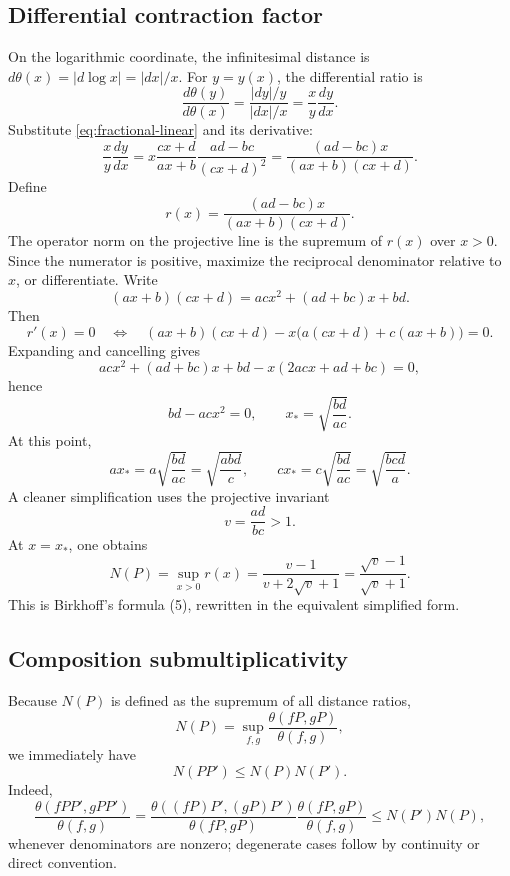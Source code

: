 \documentclass[11pt]{article}
\begin{document}
\subsection{Differential contraction factor}
On the logarithmic coordinate, the infinitesimal distance is \(d\theta(x)=|d\log x|=|dx|/x\).  For \(y=y(x)\), the differential ratio is
\begin{equation}
  \frac{d\theta(y)}{d\theta(x)}
  =\frac{|dy|/y}{|dx|/x}
  =\frac{x}{y}\frac{dy}{dx}.
\end{equation}
Substitute \eqref{eq:fractional-linear} and its derivative:
\[
  \frac{x}{y}\frac{dy}{dx}
  =x\frac{cx+d}{ax+b}\frac{ad-bc}{(cx+d)^2}
  =\frac{(ad-bc)x}{(ax+b)(cx+d)}.
\]
Define
\begin{equation}
  r(x)=\frac{(ad-bc)x}{(ax+b)(cx+d)}.
  \label{eq:differential-ratio}
\end{equation}
The operator norm on the projective line is the supremum of \(r(x)\) over \(x>0\).  Since the numerator is positive, maximize the reciprocal denominator relative to \(x\), or differentiate.  Write
\[
  (ax+b)(cx+d)=acx^2+(ad+bc)x+bd.
\]
Then
\[
  r'(x)=0
  \quad\Longleftrightarrow\quad
  (ax+b)(cx+d)-x\bigl(a(cx+d)+c(ax+b)\bigr)=0.
\]
Expanding and cancelling gives
\[
  acx^2+(ad+bc)x+bd-x(2acx+ad+bc)=0,
\]
hence
\[
  bd-acx^2=0,
  \qquad x_*=\sqrt{\frac{bd}{ac}}.
\]
At this point,
\[
  ax_* = a\sqrt{\frac{bd}{ac}}=\sqrt{\frac{abd}{c}},
  \qquad cx_* = c\sqrt{\frac{bd}{ac}}=\sqrt{\frac{bcd}{a}}.
\]
A cleaner simplification uses the projective invariant
\[
  v=\frac{ad}{bc}>1.
\]
At \(x=x_*\), one obtains
\begin{equation}
  N(P)=\sup_{x>0}r(x)=\frac{v-1}{v+2\sqrt v+1}
       =\frac{\sqrt v-1}{\sqrt v+1}.
  \label{eq:N-line-v}
\end{equation}
This is Birkhoff's formula (5), rewritten in the equivalent simplified form.

\subsection{Composition submultiplicativity}
Because \(N(P)\) is defined as the supremum of all distance ratios,
\[
  N(P)=\sup_{f,g}\frac{\theta(fP,gP)}{\theta(f,g)},
\]
we immediately have
\begin{equation}
  N(PP')\le N(P)N(P').
  \label{eq:N-submultiplicative}
\end{equation}
Indeed,
\[
  \frac{\theta(fPP',gPP')}{\theta(f,g)}
  =\frac{\theta((fP)P',(gP)P')}{\theta(fP,gP)}
   \frac{\theta(fP,gP)}{\theta(f,g)}
  \le N(P')N(P),
\]
whenever denominators are nonzero; degenerate cases follow by continuity or direct convention.
\end{document}
